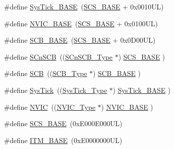 \begin{DoxyCompactItemize}
\item 
\#define \mbox{\hyperlink{group___c_m_s_i_s__core__base_ga58effaac0b93006b756d33209e814646}{Sys\+Tick\+\_\+\+B\+A\+SE}}~(\mbox{\hyperlink{group___c_m_s_i_s__core__base_ga3c14ed93192c8d9143322bbf77ebf770}{S\+C\+S\+\_\+\+B\+A\+SE}} +  0x0010\+U\+L)
\item 
\#define \mbox{\hyperlink{group___c_m_s_i_s__core__base_gaa0288691785a5f868238e0468b39523d}{N\+V\+I\+C\+\_\+\+B\+A\+SE}}~(\mbox{\hyperlink{group___c_m_s_i_s__core__base_ga3c14ed93192c8d9143322bbf77ebf770}{S\+C\+S\+\_\+\+B\+A\+SE}} +  0x0100\+U\+L)
\item 
\#define \mbox{\hyperlink{group___c_m_s_i_s__core__base_gad55a7ddb8d4b2398b0c1cfec76c0d9fd}{S\+C\+B\+\_\+\+B\+A\+SE}}~(\mbox{\hyperlink{group___c_m_s_i_s__core__base_ga3c14ed93192c8d9143322bbf77ebf770}{S\+C\+S\+\_\+\+B\+A\+SE}} +  0x0\+D00\+U\+L)
\item 
\#define \mbox{\hyperlink{group___c_m_s_i_s__core__base_ga9fe0cd2eef83a8adad94490d9ecca63f}{S\+Cn\+S\+CB}}~((\mbox{\hyperlink{struct_s_cn_s_c_b___type}{S\+Cn\+S\+C\+B\+\_\+\+Type}}    $\ast$)     \mbox{\hyperlink{group___c_m_s_i_s__core__base_ga3c14ed93192c8d9143322bbf77ebf770}{S\+C\+S\+\_\+\+B\+A\+SE}}      )
\item 
\#define \mbox{\hyperlink{group___c_m_s_i_s__core__base_gaaaf6477c2bde2f00f99e3c2fd1060b01}{S\+CB}}~((\mbox{\hyperlink{struct_s_c_b___type}{S\+C\+B\+\_\+\+Type}}       $\ast$)     \mbox{\hyperlink{group___c_m_s_i_s__core__base_gad55a7ddb8d4b2398b0c1cfec76c0d9fd}{S\+C\+B\+\_\+\+B\+A\+SE}}      )
\item 
\#define \mbox{\hyperlink{group___c_m_s_i_s__core__base_gacd96c53beeaff8f603fcda425eb295de}{Sys\+Tick}}~((\mbox{\hyperlink{struct_sys_tick___type}{Sys\+Tick\+\_\+\+Type}}   $\ast$)     \mbox{\hyperlink{group___c_m_s_i_s__core__base_ga58effaac0b93006b756d33209e814646}{Sys\+Tick\+\_\+\+B\+A\+SE}}  )
\item 
\#define \mbox{\hyperlink{group___c_m_s_i_s__core__base_gac8e97e8ce56ae9f57da1363a937f8a17}{N\+V\+IC}}~((\mbox{\hyperlink{struct_n_v_i_c___type}{N\+V\+I\+C\+\_\+\+Type}}      $\ast$)     \mbox{\hyperlink{group___c_m_s_i_s__core__base_gaa0288691785a5f868238e0468b39523d}{N\+V\+I\+C\+\_\+\+B\+A\+SE}}     )
\item 
\#define \mbox{\hyperlink{group___c_m_s_i_s__core__base_ga3c14ed93192c8d9143322bbf77ebf770}{S\+C\+S\+\_\+\+B\+A\+SE}}~(0x\+E000\+E000\+U\+L)
\item 
\#define \mbox{\hyperlink{group___c_m_s_i_s__core__base_gadd76251e412a195ec0a8f47227a8359e}{I\+T\+M\+\_\+\+B\+A\+SE}}~(0x\+E0000000\+U\+L)

\end{DoxyCompactItemize}
